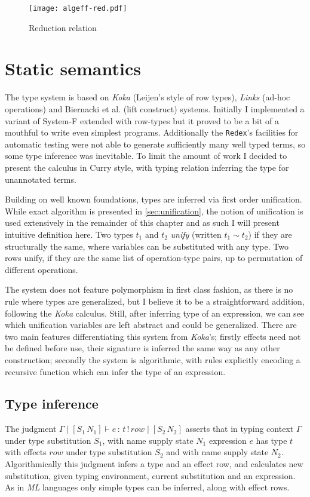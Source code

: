 \documentclass[inz, english, shortabstract]{iithesis}
\begin{document}
\begin{figure}
  \centering
  \texttt{[image: algeff-red.pdf]}
  \caption{Reduction relation} 
  \label{fig:algeff-red}
\end{figure} 

\section{Static semantics}
The type system is based on \emph{Koka}\cite{Leijen2014} (Leijen's style of row types\cite{Leijen2005}), \emph{Links}\cite{Hillerstrom2016} (ad-hoc operations) and Biernacki et al. \cite{Biernacki2017} (lift construct) systems.
Initially I implemented a variant of System-F extended with row-types but it proved to be a bit of a mouthful to write even simplest programs.
Additionally the \texttt{Redex}'s facilities for automatic testing were not able to generate sufficiently many well typed terms, so some type inference was inevitable.
To limit the amount of work I decided to present the calculus in Curry style, with typing relation inferring the type for unannotated terms.

Building on well known foundations\cite{Pierce2002}, types are inferred via first order unification.
While exact algorithm is presented in \autoref{sec:unification}, the notion of unification is used extensively in the remainder of this chapter and as such I will present intuitive definition here.
Two types $t_1$ and $t_2$ \emph{unify} (written $t_1 \sim t_2$) if they are structurally the same, where variables can be substituted with any type.
Two rows unify, if they are the same list of operation-type pairs, up to permutation of different operations.

The system does not feature polymorphism in first class fashion, as there is no rule where types are generalized, but I believe it to be a straightforward addition, following the \emph{Koka}\cite{Leijen2014} calculus.
Still, after inferring type of an expression, we can see which unification variables are left abstract and could be generalized.
There are two main features differentiating this system from \emph{Koka}'s; firstly effects need not be defined before use, their signature is inferred the same way as any other construction; secondly the system is algorithmic, with rules explicitly encoding a recursive function which can infer the type of an expression.

\subsection{Type inference}
The judgment $ \Gamma \mid [S_1 \, N_1] \vdash e \, : \, t \, ! \, row \mid [S_2 \, N_2] $ asserts that in typing context $ \Gamma $ under type substitution $ S_1 $, with name supply state $ N_1 $ expression $ e $ has type $ t $ with effects $ row $ under type substitution $ S_2 $ and with name supply state $ N_2 $.
Algorithmically this judgment infers a type and an effect row, and calculates new substitution, given typing environment, current substitution and an expression.
As in \emph{ML} languages only simple types can be inferred, along with effect rows.
\end{document}
